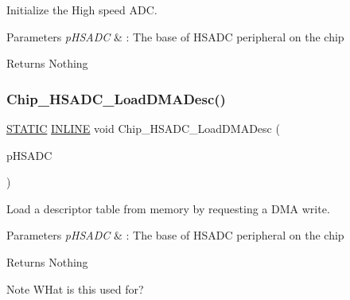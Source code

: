 Initialize the High speed A\+DC. 


\begin{DoxyParams}{Parameters}
{\em p\+H\+S\+A\+DC} & \+: The base of H\+S\+A\+DC peripheral on the chip \\
\hline
\end{DoxyParams}
\begin{DoxyReturn}{Returns}
Nothing 
\end{DoxyReturn}
\mbox{\label{group___h_s_a_d_c__18_x_x__43_x_x_gab01d315ee383688f0dea4aa939e5220f}} 
\subsubsection{\texorpdfstring{Chip\+\_\+\+H\+S\+A\+D\+C\+\_\+\+Load\+D\+M\+A\+Desc()}{Chip\_HSADC\_LoadDMADesc()}}
{\footnotesize\ttfamily \hyperlink{group___l_p_c___types___public___macros_ga10b2d890d871e1489bb02b7e70d9bdfb}{S\+T\+A\+T\+IC} \hyperlink{spifi__18xx__43xx_8h_a2eb6f9e0395b47b8d5e3eeae4fe0c116}{I\+N\+L\+I\+NE} void Chip\+\_\+\+H\+S\+A\+D\+C\+\_\+\+Load\+D\+M\+A\+Desc (\begin{DoxyParamCaption}\item[{\hyperlink{struct_l_p_c___h_s_a_d_c___t}{L\+P\+C\+\_\+\+H\+S\+A\+D\+C\+\_\+T} $\ast$}]{p\+H\+S\+A\+DC }\end{DoxyParamCaption})}



Load a descriptor table from memory by requesting a D\+MA write. 


\begin{DoxyParams}{Parameters}
{\em p\+H\+S\+A\+DC} & \+: The base of H\+S\+A\+DC peripheral on the chip \\
\hline
\end{DoxyParams}
\begin{DoxyReturn}{Returns}
Nothing 
\end{DoxyReturn}
\begin{DoxyNote}{Note}
W\+Hat is this used for? 
\end{DoxyNote}


